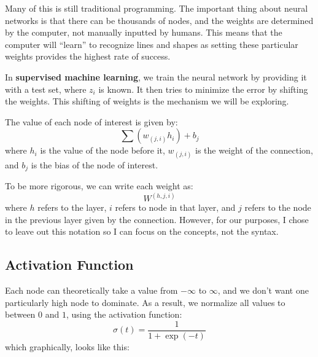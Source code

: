 \documentclass{article}
\begin{document}
    Many of this is still traditional programming. The important thing about neural networks is that there can be thousands of nodes, and the weights are determined by the computer, not manually inputted by humans. This means that the computer will ``learn'' to recognize lines and shapes as setting these particular weights provides the highest rate of success.

    In \textbf{supervised machine learning}, we train the neural network by providing it with a test set, where $z_i$ is known. It then tries to minimize the error by shifting the weights. This shifting of weights is the mechanism we will be exploring.
    
    The value of each node of interest is given by:
    \begin{equation}
        \sum (w_{(j,i)} h_i) + b_j
    \end{equation}
    where $h_i$ is the value of the node before it, $w_{(j,i)}$ is the weight of the connection, and $b_j$ is the bias of the node of interest.
    \begin{warning}
        To be more rigorous, we can write each weight as:
        \begin{equation}
            W^{(h,j,i)}
        \end{equation}
        where $h$ refers to the layer, $i$ refers to node in that layer, and $j$ refers to the node in the previous layer given by the connection. However, for our purposes, I chose to leave out this notation so I can focus on the concepts, not the syntax.
    \end{warning}
    \subsection{Activation Function}
    Each node can theoretically take a value from $-\infty$ to $\infty$, and we don't want one particularly high node to dominate. As a result, we normalize all values to between $0$ and $1$, using the activation function:
    \begin{equation}
        \sigma(t) = \frac{1}{1+\exp(-t)}
    \end{equation}
    which graphically, looks like this:
    \begin{center}
    \end{center}
\end{document}
